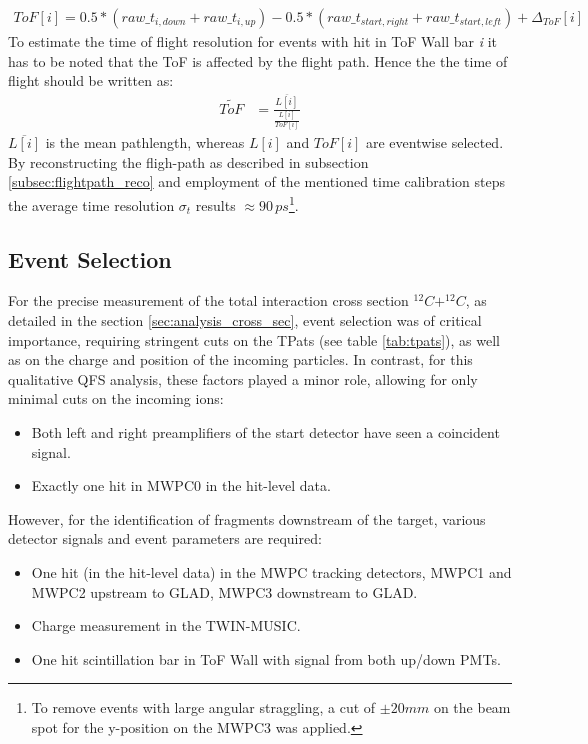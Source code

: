 \begin{align*}
ToF[i] = 0.5*(raw\_t_{i,down}+raw\_t_{i,up}) - 0.5*(raw\_t_{start,right}+raw\_t_{start,left}) + \Delta_{ToF}[i]
\end{align*}  
To estimate the time of flight resolution for events with hit in ToF Wall bar \textit{i} it has to be noted that the ToF is affected by the flight path. Hence the the time of flight should be written as:
\begin{align*}
\widetilde{ToF} &= \frac{\overline{L[i]}}{\frac{L[i]}{ToF[i]}}
\end{align*}
$\overline{L[i]}$ is the mean pathlength, whereas $L[i]$ and $ToF[i]$ are eventwise selected.
By reconstructing the fligh-path as described in subsection \ref{subsec:flightpath_reco} and employment of the mentioned time calibration steps the average time resolution $\sigma_t$ results $\approx 90\, ps$\footnote{To remove events with large angular straggling, a cut of $\pm 20mm$ on the beam spot for the y-position on the MWPC3 was applied.}.

\subsection{Event Selection}
For the precise measurement of the total interaction cross section $^{12}C + ^{12}C$, as detailed in the section \ref{sec:analysis_cross_sec}, event selection was of critical importance, requiring stringent cuts on the TPats (see table \ref{tab:tpats}), as well as on the charge and position of the incoming particles. In contrast, for this qualitative QFS analysis, these factors played a minor role, allowing for only minimal cuts on the incoming ions:
\begin{itemize}
\item Both left and right preamplifiers of the start detector have seen a coincident signal.
\item Exactly one hit in MWPC0 in the hit-level data.
\end{itemize}
However, for the identification of fragments downstream of the target, various detector signals and event parameters are required:
\begin{itemize} 
\item One hit (in the hit-level data) in the MWPC tracking detectors, MWPC1 and MWPC2 upstream to GLAD, MWPC3 downstream to GLAD.
\item Charge measurement in the TWIN-MUSIC.
\item One hit scintillation bar in ToF Wall with signal from both up/down PMTs.
\end{itemize}
